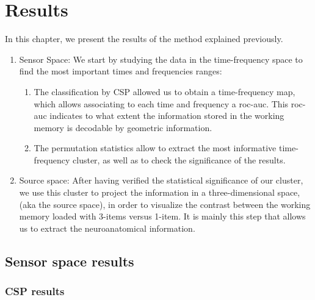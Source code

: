 \chapter{Results}

In this chapter, we present the results of the method explained previously.

\begin{enumerate}
    \item Sensor Space: We start by studying the data in the time-frequency space to find the most important times and frequencies ranges:
          \begin{enumerate}
              \item The classification by CSP allowed us to obtain a time-frequency map, which allows associating to each time and frequency a roc-auc. This roc-auc indicates to what extent the information stored in the working memory is decodable by geometric information.
              \item The permutation statistics allow to extract the most informative time-frequency cluster, as well as to check the significance of the results.
          \end{enumerate}

    \item Source space: After having verified the statistical significance of our cluster, we use this cluster to project the information in a three-dimensional space, (aka the source space), in order to visualize the contrast between the working memory loaded with 3-items versus 1-item. It is mainly this step that allows us to extract the neuroanatomical information.
\end{enumerate}

\section{Sensor space results}

\subsection{CSP results}


